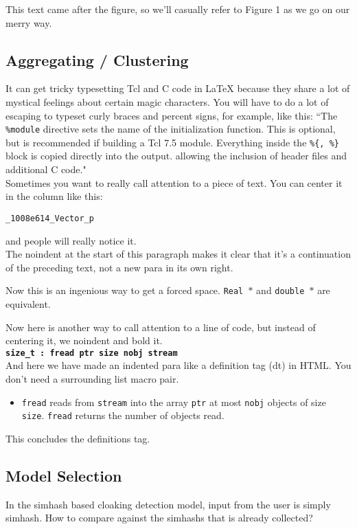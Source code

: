 \documentclass[letterpaper,twocolumn,10pt]{article}
\begin{document}
This text came after the figure, so we'll casually refer to Figure 1
as we go on our merry way.

\subsection{Aggregating / Clustering}

It can get tricky typesetting Tcl and C code in LaTeX because they share
a lot of mystical feelings about certain magic characters.  You
will have to do a lot of escaping to typeset curly braces and percent
signs, for example, like this:
``The {\tt \%module} directive
sets the name of the initialization function.  This is optional, but is
recommended if building a Tcl 7.5 module.
Everything inside the {\tt \%\{, \%\}}
block is copied directly into the output. allowing the inclusion of
header files and additional C code." \\

Sometimes you want to really call attention to a piece of text.  You
can center it in the column like this:
\begin{center}
{\tt \_1008e614\_Vector\_p}
\end{center}
and people will really notice it.\\

\noindent
The noindent at the start of this paragraph makes it clear that it's
a continuation of the preceding text, not a new para in its own right.


Now this is an ingenious way to get a forced space.
{\tt Real~$*$} and {\tt double~$*$} are equivalent. 

Now here is another way to call attention to a line of code, but instead
of centering it, we noindent and bold it.\\

\noindent
{\bf \tt size\_t : fread ptr size nobj stream } \\

And here we have made an indented para like a definition tag (dt)
in HTML.  You don't need a surrounding list macro pair.
\begin{itemize}
\item[]  {\tt fread} reads from {\tt stream} into the array {\tt ptr} at
most {\tt nobj} objects of size {\tt size}.   {\tt fread} returns
the number of objects read. 
\end{itemize}
This concludes the definitions tag.

\subsection{Model Selection}
In the simhash based cloaking detection model, input from the user is simply simhash. How to compare against the simhashs that is already collected?
\end{document}
